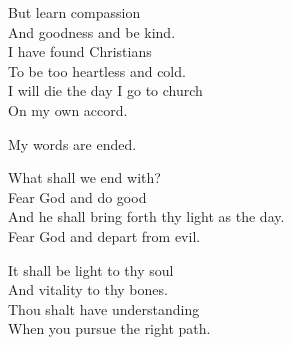 \documentclass[
]{book}
\begin{document}
But learn compassion\\
And goodness and be kind.\\
I have found Christians\\
To be too heartless and cold.\\
I will die the day I go to church\\
On my own accord.

My words are ended.

What shall we end with?\\
Fear God and do good\\
And he shall bring forth thy light as the day.\\
Fear God and depart from evil.

It shall be light to thy soul\\
And vitality to thy bones.\\
Thou shalt have understanding\\
When you pursue the right path.


\end{document}
